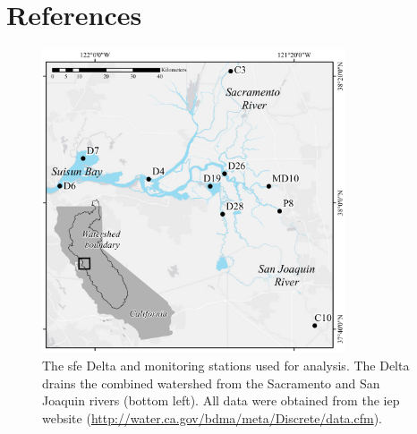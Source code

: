\documentclass[journal = esthag, manuscript = article]{achemso}\usepackage[]{graphicx}\usepackage[]{color}
\begin{document}
\section{References} %
\begin{singlespace}

\end{singlespace}

\begin{figure}
\centering
\includegraphics[width=0.8\textwidth,page=1]{figs/delt_map.pdf}
\caption{The \acl{sfe} Delta and monitoring stations used for analysis. The Delta drains the combined watershed from the Sacramento and San Joaquin rivers (bottom left). All data were obtained from the \acl{iep} website (\url{http://water.ca.gov/bdma/meta/Discrete/data.cfm})\cite{IEP13}.}
\label{fig:delt_map}   
\end{figure}
\end{document}
